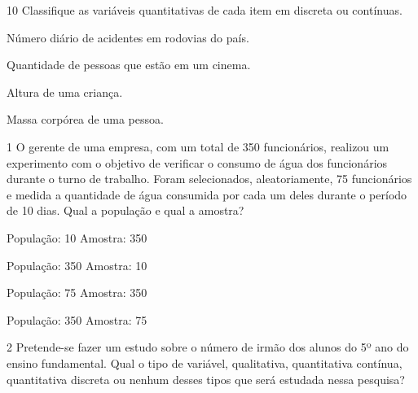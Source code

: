 \num{10} Classifique as variáveis quantitativas de cada item em discreta ou
contínuas.

\begin{escolha}
\item
  Número diário de acidentes em rodovias do país.


\item
  Quantidade de pessoas que estão em um cinema.


\item
  Altura de uma criança.


\item
  Massa corpórea de uma pessoa.

\end{escolha}



\num{1} O gerente de uma empresa, com um total de 350 funcionários,
realizou um experimento com o objetivo de verificar o consumo de água
dos funcionários durante o turno de trabalho. Foram selecionados,
aleatoriamente, 75 funcionários e medida a quantidade de água consumida
por cada um deles durante o período de 10 dias. Qual a população e qual
a amostra?

\begin{escolha}
\item
  População: 10 Amostra: 350
\item
  População: 350 Amostra: 10
\item
  População: 75 Amostra: 350
\item
  População: 350 Amostra: 75
\end{escolha}


\num{2} Pretende-se fazer um estudo sobre o número de irmão dos alunos do
5º ano do ensino fundamental. Qual o tipo de variável, qualitativa,
quantitativa contínua, quantitativa discreta ou nenhum desses tipos que
será estudada nessa pesquisa?

